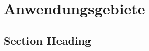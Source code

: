 \chapter{Anwendungsgebiete}
\label{applications} %



\section{Section Heading}

\printbibliography

